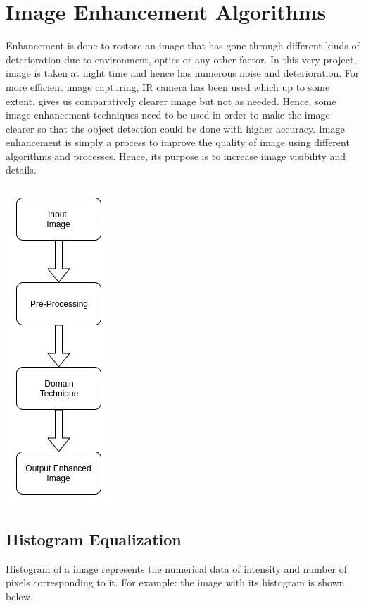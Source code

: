 \documentclass[12pt, a4paper, font = Times New Roman]{article}
\begin{document}
\newpage
\section{Image Enhancement Algorithms}

\par
Enhancement is done to restore an image that has gone through different kinds of deterioration due to environment, optics or any other factor. In this very project, image is taken at night time and hence has numerous noise and deterioration. For more efficient image capturing, IR camera has been used which up to some extent, gives us comparatively clearer image but not as needed. Hence, some image enhancement techniques need to be used in order to make the image clearer so that the object detection could be done with higher accuracy. Image enhancement is simply a process to improve the quality of image using different algorithms and processes. Hence, its purpose is to increase image visibility and details.



\begin{center}
\includegraphics[scale=0.5]{Untitled_Diagram__2_.png}
\label{fig: Image_enhancement}
\end{center}

    \subsection{Histogram Equalization}
    \par
    Histogram of a image represents the numerical data of intensity and number of pixels corresponding to it. For example: the image with its histogram is shown below.
\end{document}
